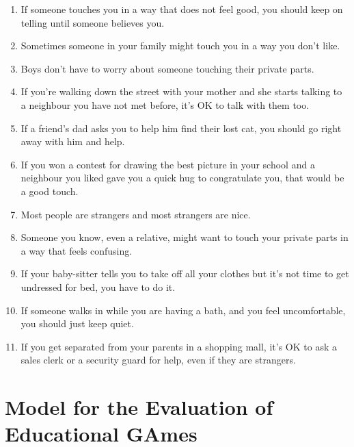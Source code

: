 \begin{anexosenv}
\begin{enumerate}
	\item If someone touches you in a way that does not feel good, you should keep on telling until someone believes you.
	\item Sometimes someone in your family might touch you in a way you don't like.
	\item Boys don't have to worry about someone touching their private parts.
	\item If you're walking down the street with your mother and she starts talking to a neighbour you have not met before, it's OK to talk with them too.
	\item If a friend's dad asks you to help him find their lost cat, you should go right away with him and help.
	\item If you won a contest for drawing the best picture in your school and a neighbour you liked gave you a quick hug to congratulate you, that would be a good touch.
	\item Most people are strangers and most strangers are nice.
	\item Someone you know, even a relative, might want to touch your private parts in a way that feels confusing.
	\item If your baby-sitter tells you to take off all your clothes but it's not time to get undressed for bed, you have to do it.
	\item If someone walks in while you are having a bath, and you feel uncomfortable, you should just keep quiet.
	\item If you get separated from your parents in a shopping mall, it's OK to ask a sales clerk or a security guard for help, even if they are strangers. 
\end{enumerate}





\chapter{Model for the Evaluation of Educational GAmes}\label{chap:MEEGA}


\end{anexosenv}
